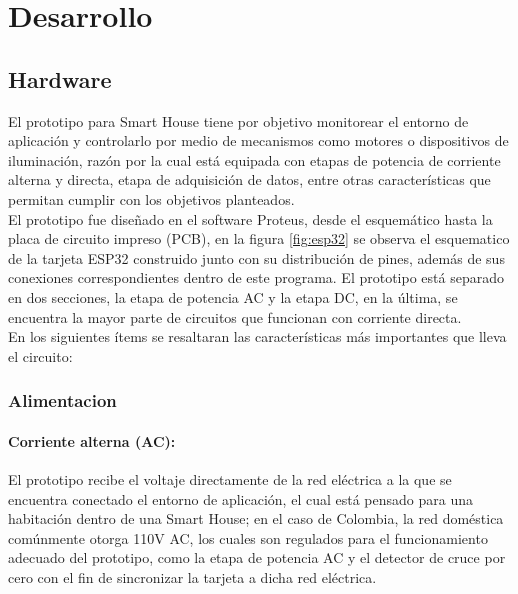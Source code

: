 \section{Desarrollo}
\subsection{Hardware}\label{sec:hw}

El prototipo para Smart House tiene por objetivo monitorear el entorno de aplicación y controlarlo por medio de mecanismos como motores o dispositivos de iluminación, razón por la cual está equipada con etapas de potencia de corriente alterna y directa, etapa de adquisición de datos, entre otras características que permitan cumplir con los objetivos planteados.\\ 

El prototipo fue diseñado en el software Proteus, desde el esquemático hasta la placa de circuito impreso (PCB), en la figura \ref{fig:esp32} se observa el esquematico de la tarjeta ESP32 construido junto con su distribución de pines, además de sus conexiones correspondientes dentro de este programa. El prototipo está separado en dos secciones, la etapa de potencia AC y la etapa DC, en la última, se encuentra la mayor parte de circuitos que funcionan con corriente directa.\\


En los siguientes ítems se resaltaran las características más importantes que lleva el circuito:\\

	\subsubsection{Alimentacion}
	
	\paragraph{Corriente alterna (AC):}
		El prototipo recibe el voltaje directamente de la red eléctrica a la que se encuentra conectado el entorno de aplicación, el cual está pensado para una habitación dentro de una Smart House; en el caso de Colombia, la red doméstica comúnmente otorga 110V AC, los cuales son regulados para el funcionamiento adecuado del prototipo, como la etapa de potencia AC y el detector de cruce por cero con el fin de sincronizar la tarjeta a dicha red eléctrica.\\
		
